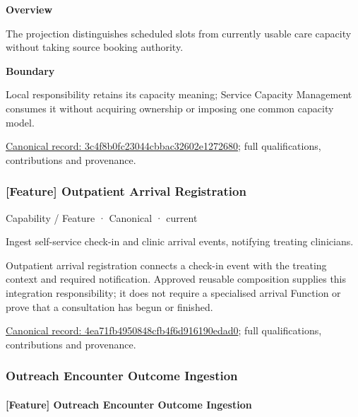\textbf{Overview}



The projection distinguishes scheduled slots from currently usable care capacity without taking source booking authority.



\textbf{Boundary}



Local responsibility retains its capacity meaning; Service Capacity Management consumes it without acquiring ownership or imposing one common capacity model.


{\footnotesize \href{../../../../continuum/strategy/capability/feature/3c4f8b0fc23044cbbac32602e1272680.md}{Canonical record: 3c4f8b0fc23044cbbac32602e1272680}; full qualifications, contributions and provenance.}\par
\subsubsection{[Feature] Outpatient Arrival Registration}

\label{element:4ea71fb4950848cfb4f6d916190edad0}
{\small Capability / Feature · Canonical · current}\par

Ingest self-service check-in and clinic arrival events, notifying treating clinicians.



Outpatient arrival registration connects a check-in event with the treating context and required notification. Approved reusable composition supplies this integration responsibility; it does not require a specialised arrival Function or prove that a consultation has begun or finished.


{\footnotesize \href{../../../../continuum/strategy/capability/feature/4ea71fb4950848cfb4f6d916190edad0.md}{Canonical record: 4ea71fb4950848cfb4f6d916190edad0}; full qualifications, contributions and provenance.}\par
\subsubsection{Outreach Encounter Outcome Ingestion}

\paragraph{[Feature] Outreach Encounter Outcome Ingestion}

